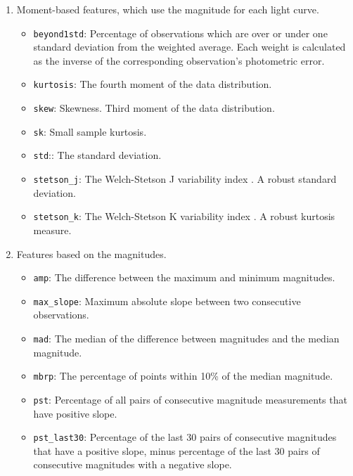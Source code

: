 \documentclass[a4paper,fleqn,usenatbib]{mnras}
\begin{document}
\begin{enumerate}
    
\item Moment-based features, which use the magnitude for each light curve.
  \begin{itemize}
  \item \texttt{beyond1std}: 
    Percentage of observations which are over or under one standard
    deviation from the weighted average. Each weight is calculated as
    the inverse of the corresponding observation's photometric error. 
  \item \texttt{kurtosis}: 
    The fourth moment of the data distribution. 
  \item \texttt{skew}: 
    Skewness. Third moment of the data distribution.
  \item \texttt{sk}:
    Small sample kurtosis.
  \item \texttt{std}::
    The standard deviation.
  \item \texttt{stetson\_j}:
    The Welch-Stetson J variability index
    \citep{1996PASP..108..851S}. A robust standard deviation. 
  \item \texttt{stetson\_k}:  The Welch-Stetson K variability index
    \citep{1996PASP..108..851S}. A robust kurtosis measure. 
  \end{itemize}
  
\item Features based on the magnitudes.
    \begin{itemize}
    \item \texttt{amp}: 
      The difference between the maximum and minimum magnitudes.
    \item \texttt{max\_slope}: 
      Maximum absolute slope between two consecutive observations.
    \item \texttt{mad}: 
      The median of the difference between magnitudes and the median
      magnitude. 
    \item \texttt{mbrp}: 
      The percentage of points within 10\% of the median magnitude.
    \item \texttt{pst}: 
      Percentage of all pairs of consecutive magnitude measurements that have positive slope.
    \item \texttt{pst\_last30}: 
      Percentage of the last 30 pairs of consecutive magnitudes that
      have a positive slope, minus percentage of the last 30 pairs of
      consecutive magnitudes with a negative slope. 
    \end{itemize} 



\end{enumerate}
\end{document}
